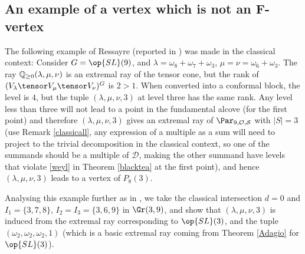 \subsection{An example of a vertex which is not an F-vertex}\label{Rex}
The following example of Ressayre (reported in \cite[Section 10.5]{BHermit}) was made in the classical context:
Consider $G=\op{SL}(9)$, and  $\lambda=\omega_8+\omega_7+\omega_3$, $\mu=\nu=\omega_6+\omega_3$. The ray $\Bbb{Q}_{\ge 0}(\lambda,\mu,\nu)$ is an extremal ray of the tensor cone, but the rank of $(V_{\lambda}\tensor V_{\mu}\tensor V_{\nu})^G$ is $2>1$. When converted into a conformal block, the level is $4$, but the tuple $(\lambda,\mu,\nu,3)$ at level three has the same rank. Any level less than three will not
lead to a point in the fundamental alcove (for the first point) and therefore $(\lambda,\mu,\nu,3)$ gives an extremal ray of $\Par_{9,\mathcal{O,S}}$ with $|S|=3$ (use Remark \ref{classicall}, any expression of a multiple as a sum will need to project to the trivial decomposition in the classical context, so one of the summands should be a multiple of $\mathcal{D}$, making the other summand have levels that violate \eqref{weyl} in Theorem \ref{blacktea} at the first point),  and hence $(\lambda,\mu,\nu,3)$ leads to a vertex of $P_8(3)$.

Analysing this example further as in \cite[Section 10.5]{BHermit}, we take the classical intersection $d=0$ and $I_1=\{3,7,8\}$, $I_2=I_3=\{3,6,9\}$ in $\Gr(3,9)$, and show that $(\lambda,\mu,\nu,3)$ is induced from the extremal ray corresponding to $\op{SL}(3)$, and the tuple $(\omega_2,\omega_2,\omega_2,1)$ (which is a basic extremal ray  coming from Theorem \ref{Adagio} for $\op{SL}(3)$).
